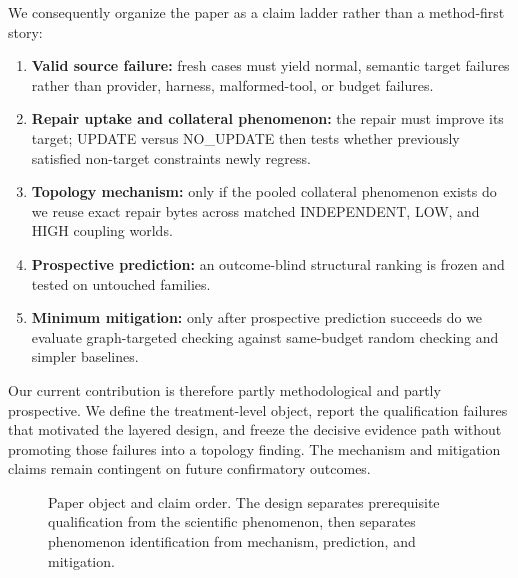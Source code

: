 \documentclass{article}
\begin{document}
We consequently organize the paper as a claim ladder rather than a method-first story:
\begin{enumerate}
 \item \textbf{Valid source failure:} fresh cases must yield normal, semantic target failures rather than provider, harness, malformed-tool, or budget failures.
 \item \textbf{Repair uptake and collateral phenomenon:} the repair must improve its target; UPDATE versus NO\_UPDATE then tests whether previously satisfied non-target constraints newly regress.
 \item \textbf{Topology mechanism:} only if the pooled collateral phenomenon exists do we reuse exact repair bytes across matched INDEPENDENT, LOW, and HIGH coupling worlds.
 \item \textbf{Prospective prediction:} an outcome-blind structural ranking is frozen and tested on untouched families.
 \item \textbf{Minimum mitigation:} only after prospective prediction succeeds do we evaluate graph-targeted checking against same-budget random checking and simpler baselines.
\end{enumerate}

Our current contribution is therefore partly methodological and partly prospective. We define the treatment-level object, report the qualification failures that motivated the layered design, and freeze the decisive evidence path without promoting those failures into a topology finding. The mechanism and mitigation claims remain contingent on future confirmatory outcomes.

\begin{figure}[t]
\centering
{}
\caption{Paper object and claim order. The design separates prerequisite qualification from the scientific phenomenon, then separates phenomenon identification from mechanism, prediction, and mitigation.}
\label{fig:object}
\end{figure}
\end{document}
